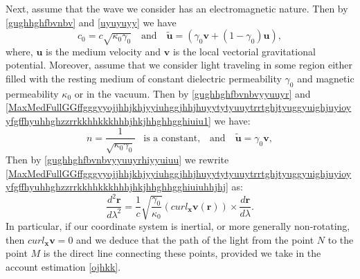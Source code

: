\documentclass{article}
\theoremstyle{definition}
\theoremstyle{remark}
\renewcommand{\vec}[1]{\mathbf{#1}}
\newcommand{\er}{\eqref}
\newcommand{\er}{\eqref}
\begin{document}
Next, assume that the wave we consider has an electromagnetic
nature. Then by \er{gughhghfbvnbv} and \er{uyuyuyy} we have
\begin{equation}\label{gughhghfbvnbvyyuuyr}
c_0=c\sqrt{\kappa_0\gamma_0}\quad\text{and}\quad\vec {\tilde
u}=\left(\gamma_0\vec v+(1-\gamma_0)\vec u\right),
\end{equation}
where, $\vec u$ is the medium velocity and $\vec v$ is the local
vectorial gravitational potential. Moreover, assume that we consider
light traveling in some region either filled with the resting medium
of constant dielectric permeability $\gamma_0$ and magnetic
permeability $\kappa_0$ or in the vacuum. Then by
\er{gughhghfbvnbvyyuuyr} and
\er{MaxMedFullGGffgggyyojjhhjkhjyyiuhggjhhjhuyytytyuuytrrtghjtyuggyuighjuyioyyfgffhyuhhghzzrrkkhhkkkhhhjhkjhhghhgghiuiu1}
we have:
\begin{equation}\label{gughhghfbvnbvyyuuyrhiyyuiuu}
n=\frac{1}{\sqrt{\kappa_0\gamma_0}}\;\;\;\text{is a
constant,}\quad\text{and}\quad\vec {\tilde u}=\gamma_0\vec v,
\end{equation}
Then by \er{gughhghfbvnbvyyuuyrhiyyuiuu} we rewrite
\er{MaxMedFullGGffgggyyojjhhjkhjyyiuhggjhhjhuyytytyuuytrrtghjtyuggyuighjuyioyyfgffhyuhhghzzrrkkhhkkkhhhjhkjhhghhgghiuiuhhjhj}
as:
\begin{equation}\label{MaxMedFullGGffgggyyojjhhjkhjyyiuhggjhhjhuyytytyuuytrrtghjtyuggyuighjuyioyyfgffhyuhhghzzrrkkhhkkkhhhjhkjhhghhgghiuiuhhjhjiuiuyu}
\frac{d^2\vec
r}{d\lambda^2}=\frac{1}{c}\sqrt{\frac{\gamma_0}{\kappa_0}}\left(curl_{\vec
x}\vec v\left(\vec r\right)\right)\times\frac{d\vec r}{d\lambda}.
\end{equation}
In particular, if our coordinate system is inertial, or more
generally non-rotating, then $curl_{\vec x}\vec v=0$ and we deduce
that the path of the light from the point $N$ to the point $M$ is
the direct line connecting these points, provided we take in the
account estimation \er{ojhkk}.
\end{document}
